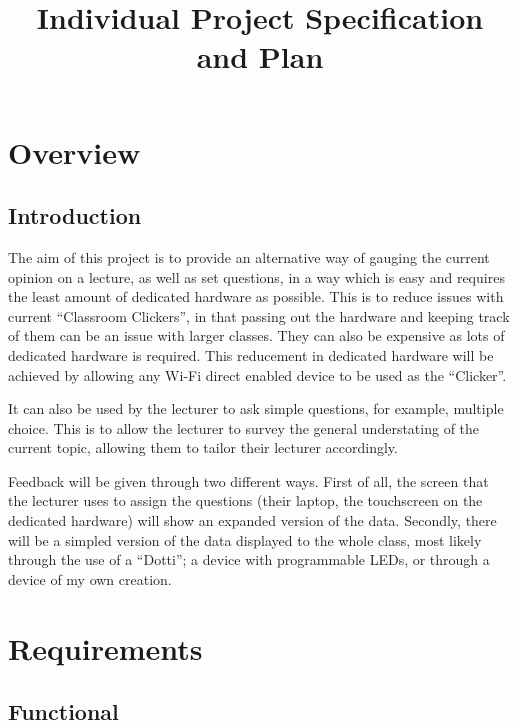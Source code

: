 \documentclass{article}
\title{
\textmd{\textbf{Individual Project Specification and Plan}}\\
}
\author{\textbf{\hmwkAuthorName}}
\begin{document}
\newpage
\section{Overview}
\subsection{Introduction}
The aim of this project is to provide an alternative way of gauging the current opinion on a lecture, as well as set questions, in a way which is easy and requires the least amount of dedicated hardware as possible. This is to reduce issues with current ``Classroom Clickers'', in that passing out the hardware and keeping track of them can be an issue with larger classes. They can also be expensive as lots of dedicated hardware is required. This reducement in dedicated hardware will be achieved by allowing any Wi-Fi direct enabled device to be used as the ``Clicker''.

It can also be used by the lecturer to ask simple questions, for example, multiple choice. This is to allow the lecturer to survey the general understating of the current topic, allowing them to tailor their lecturer accordingly.

Feedback will be given through two different ways. First of all, the screen that the lecturer uses to assign the questions (their laptop, the touchscreen on the dedicated hardware) will show an expanded version of the data. Secondly, there will be a simpled version of the data displayed to the whole class, most likely through the use of a ``Dotti''; a device with programmable LEDs, or through a device of my own creation.

\section{Requirements}
\subsection{Functional}
\end{document}
